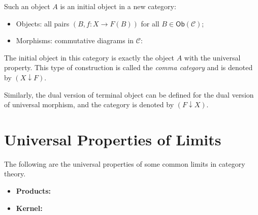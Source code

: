 \documentclass[
	11pt, %
	fleqn, %
	a4paper, %
]{LegrandOrangeBook}
\renewcommand{\ker}[1]{\mathsf{Ker}(#1)} %
\newcommand{\C}{\mathcal{C}} %
\newcommand{\Ob}[1]{\mathsf{Ob}(#1)} %
\begin{document}
\begin{appendices}
\begin{remark}
    Such an object $A$ is an initial object in a new category:
    \begin{itemize}
        \item Objects: all pairs $(B, f : X \to F(B))$ for all $B \in \Ob{\C}$;
        \item Morphisms: commutative diagrams in $\C$:
    \end{itemize}
    \begin{center}
    \end{center}
    The initial object in this category is exactly the object $A$ with the universal property. This type of construction is called the \emph{comma category} and is denoted by $(X \downarrow F)$.

    Similarly, the dual version of terminal object can be defined for the dual version of universal morphism, and the category is denoted by $(F \downarrow X)$.
\end{remark}

\section{Universal Properties of Limits}

The following are the universal properties of some common limits in category theory.

\begin{itemize}
    \item \textbf{Products:}
    \begin{center}
    \end{center}

    \item \textbf{Kernel:}
    \begin{center}
    \end{center}


\end{itemize}
\end{appendices}
\end{document}
